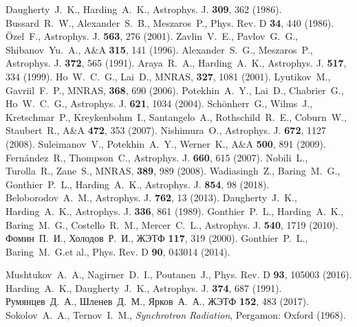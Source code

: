 \documentclass[cp1251%
               ]{jetp} %
\begin{document}
\begin{references}
%
  Daugherty~J.~K., Harding~A.~K., Astrophys. J. {\bf 309}, 362 (1986).
%
Bussard~R.~W., Alexander~S.~B., Meszaros~P., Phys. Rev. D {\bf 34}, 440 (1986).
%
  {\"O}zel~F., Astrophys. J. {\bf 563}, 276 (2001).
%
  Zavlin~V.~E., Pavlov~G.~G., Shibanov~Yu.~A., A\&A {\bf 315}, 141 (1996).
%
   Alexander~S.~G., Meszaros~P.,  Astrophys. J. {\bf 372}, 565 (1991).
%
  Araya~R.~A., Harding~A.~K.,  Astrophys. J. {\bf 517}, 334 (1999).
%
  Ho~W.~C.~G., Lai~D., MNRAS, {\bf 327}, 1081 (2001).
%
   Lyutikov~M., Gavriil~F.~P., MNRAS, {\bf 368}, 690 (2006).
%
  Potekhin~A.~Y., Lai~D., Chabrier~G., Ho~W.~C.~G., Astrophys. J. {\bf 621}, 1034 (2004).
%
   Sch{\"o}nherr~G., Wilms~J., Kretschmar~P., Kreykenbohm~I., Santangelo~A., Rothschild~R.~E., Coburn~W., Staubert~R., 
   A{\&}A {\bf 472}, 353 (2007).
%
  Nishimura~O., Astrophys. J. {\bf 672}, 1127 (2008).
   Suleimanov~V., Potekhin~A.~Y., Werner~K., A{\&}A {\bf 500}, 891 (2009).
   Fern{\'a}ndez~R., Thompson~C., Astrophys. J. {\bf 660}, 615 (2007).
Nobili~L., Turolla~R., Zane~S., MNRAS, {\bf 389}, 989 (2008).
%
Wadiasingh~Z., Baring~M.~G., Gonthier~P.~L., Harding~A.~K., Astrophys. J. {\bf 854}, 98 (2018).
%
  Beloborodov~A.~M., Astrophys. J. {\bf 762}, 13 (2013).
%
  Daugherty~J.~K., Harding~A.~K., Astrophys. J. {\bf 336}, 861 (1989).
%
Gonthier~P.~L., Harding~A.~K., Baring~M.~G., Costello~R.~M., Mercer~C.~L., Astrophys. J. {\bf 540}, 1719 (2010).
%
Фомин~П.~И., Холодов~Р.~И., ЖЭТФ {\bf 117}, 319 (2000). 
%
Gonthier~P.~L., Baring~M.~G.et al., 
   Phys. Rev. D {\bf 90},  043014 (2014).

%
Mushtukov~A.~A., Nagirner~D.~I., Poutanen~J., Phys. Rev. D {\bf 93}, 105003 (2016).
%
Harding~A.~K., Daugherty~J.~K., Astrophys. J. {\bf 374}, 687 (1991).
%
Румянцев~Д.~А., Шленев~Д.~М., Ярков~А.~А., ЖЭТФ {\bf 152}, 483 (2017). 
%
   Sokolov~A.~A., Ternov~I.~M., {\it Synchrotron Radiation}, Pergamon: Oxford (1968).


\end{references}
\end{document}
